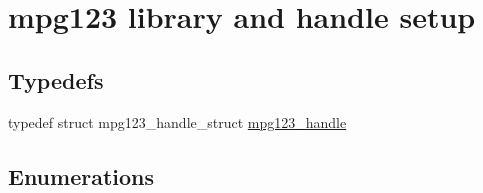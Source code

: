 \hypertarget{group__mpg123__init}{}\section{mpg123 library and handle setup}
\label{group__mpg123__init}
\subsection*{Typedefs}
\begin{DoxyCompactItemize}
\item 
typedef struct mpg123\+\_\+handle\+\_\+struct \mbox{\hyperlink{group__mpg123__init_ga6728e2839a395f3a07d4514da659faca}{mpg123\+\_\+handle}}
\end{DoxyCompactItemize}
\subsection*{Enumerations}
